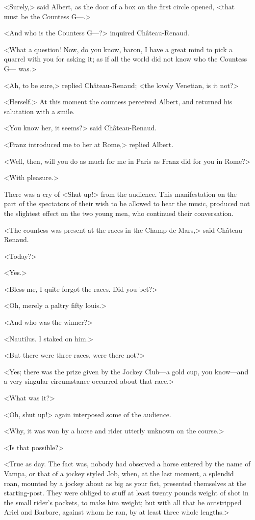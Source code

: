  <Surely,> said Albert, as the door of a box on the first circle opened, <that must be the Countess G—.> 

 <And who is the Countess G—?> inquired Château-Renaud. 

 <What a question! Now, do you know, baron, I have a great mind to pick a quarrel with you for asking it; as if all the world did not know who the Countess G— was.> 

 <Ah, to be sure,> replied Château-Renaud; <the lovely Venetian, is it not?> 

 <Herself.> At this moment the countess perceived Albert, and returned his salutation with a smile. 

 <You know her, it seems?> said Château-Renaud. 

 <Franz introduced me to her at Rome,> replied Albert. 

 <Well, then, will you do as much for me in Paris as Franz did for you in Rome?> 

 <With pleasure.> 

 There was a cry of <Shut up!> from the audience. This manifestation on the part of the spectators of their wish to be allowed to hear the music, produced not the slightest effect on the two young men, who continued their conversation. 

 <The countess was present at the races in the Champ-de-Mars,> said Château-Renaud. 

 <Today?> 

 <Yes.> 

 <Bless me, I quite forgot the races. Did you bet?> 

 <Oh, merely a paltry fifty louis.> 

 <And who was the winner?> 

 <Nautilus. I staked on him.> 

 <But there were three races, were there not?> 

 <Yes; there was the prize given by the Jockey Club—a gold cup, you know—and a very singular circumstance occurred about that race.> 

 <What was it?> 

 <Oh, shut up!> again interposed some of the audience. 

 <Why, it was won by a horse and rider utterly unknown on the course.> 

 <Is that possible?> 

 <True as day. The fact was, nobody had observed a horse entered by the name of Vampa, or that of a jockey styled Job, when, at the last moment, a splendid roan, mounted by a jockey about as big as your fist, presented themselves at the starting-post. They were obliged to stuff at least twenty pounds weight of shot in the small rider's pockets, to make him weight; but with all that he outstripped Ariel and Barbare, against whom he ran, by at least three whole lengths.> 

